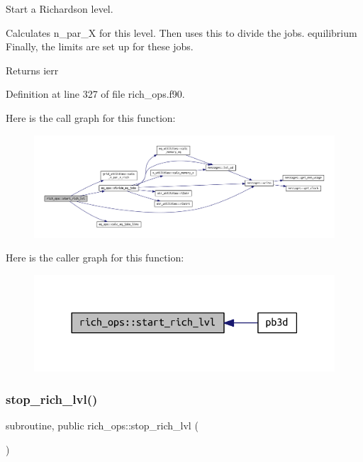Start a Richardson level. 

Calculates {\ttfamily n\+\_\+par\+\_\+X} for this level. Then uses this to divide the jobs. equilibrium Finally, the limits are set up for these jobs.

\begin{DoxyReturn}{Returns}
ierr 
\end{DoxyReturn}


Definition at line 327 of file rich\+\_\+ops.\+f90.

Here is the call graph for this function\+:
\nopagebreak
\begin{figure}[H]
\begin{center}
\leavevmode
\includegraphics[width=350pt]{namespacerich__ops_a97206a15127960366fcb41d6889cb3b5_cgraph}
\end{center}
\end{figure}
Here is the caller graph for this function\+:\nopagebreak
\begin{figure}[H]
\begin{center}
\leavevmode
\includegraphics[width=318pt]{namespacerich__ops_a97206a15127960366fcb41d6889cb3b5_icgraph}
\end{center}
\end{figure}
\mbox{\label{namespacerich__ops_a0cce16b835e18b025d366a038b22efe1}} 
\subsubsection{\texorpdfstring{stop\+\_\+rich\+\_\+lvl()}{stop\_rich\_lvl()}}
{\footnotesize\ttfamily subroutine, public rich\+\_\+ops\+::stop\+\_\+rich\+\_\+lvl (\begin{DoxyParamCaption}{ }\end{DoxyParamCaption})}



